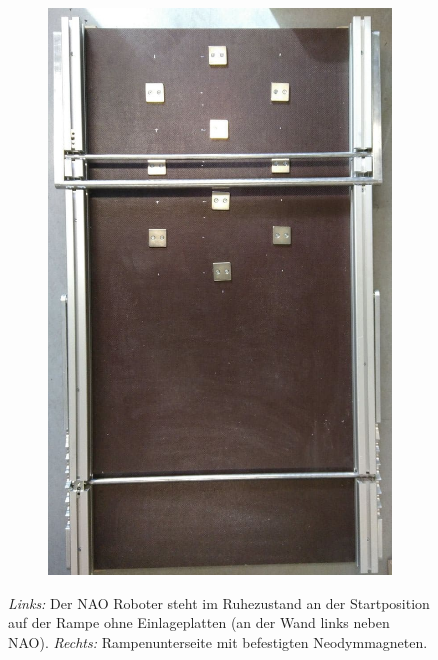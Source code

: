 \begin{figure}[tb]
\begin{subfigure}[c]{0.4\linewidth}
	\end{subfigure}
	\hfill
	\begin{subfigure}[c]{0.4315\linewidth}
		\centering
		\includegraphics[width=\linewidth]{Bilder/magneten_an_rampe1_geschnitten.jpg}
	\end{subfigure}
	\hfill
	\caption{\textit{Links:} Der NAO Roboter steht im Ruhezustand an der Startposition auf der Rampe ohne Einlageplatten (an der Wand links neben NAO). \textit{Rechts:} Rampenunterseite mit befestigten Neodymmagneten.}
	\label{nao_und_rampe}
\end{figure}

